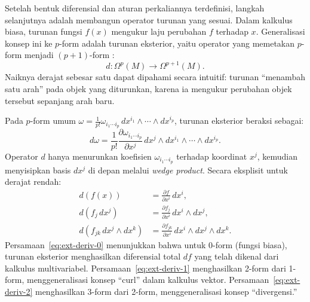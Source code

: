 Setelah bentuk diferensial dan aturan perkaliannya terdefinisi, langkah selanjutnya adalah membangun operator turunan yang sesuai. Dalam kalkulus biasa, turunan fungsi $f(x)$ mengukur laju perubahan $f$ terhadap $x$. Generalisasi konsep ini ke $p$-form adalah turunan eksterior, yaitu operator yang memetakan $p$-form menjadi $(p+1)$-form \cite{nakahara2003geometry}:
\begin{equation}
    d : \Omega^p(M) \longrightarrow \Omega^{p+1}(M).
\end{equation}
Naiknya derajat sebesar satu dapat dipahami secara intuitif: turunan ``menambah satu arah'' pada objek yang diturunkan, karena ia mengukur perubahan objek tersebut sepanjang arah baru.

Pada $p$-form umum $\omega = \frac{1}{p!}\omega_{i_1\cdots i_p}\, dx^{i_1} \wedge \cdots \wedge dx^{i_p}$, turunan eksterior beraksi sebagai:
\begin{equation}\label{eq:ext-deriv}
    d\omega = \frac{1}{p!}\frac{\partial \omega_{i_1\cdots i_p}}{\partial x^j}\, dx^j \wedge dx^{i_1} \wedge \cdots \wedge dx^{i_p}.
\end{equation}
Operator $d$ hanya menurunkan koefisien $\omega_{i_1\cdots i_p}$ terhadap koordinat $x^j$, kemudian menyisipkan basis $dx^j$ di depan melalui \textit{wedge product}. Secara eksplisit untuk derajat rendah:
\begin{align}
    d(f(x)) &= \frac{\partial f}{\partial x^i}\, dx^i, \label{eq:ext-deriv-0}\\
    d(f_j\, dx^j) &= \frac{\partial f_j}{\partial x^i}\, dx^i \wedge dx^j, \label{eq:ext-deriv-1}\\
    d(f_{jk}\, dx^j \wedge dx^k) &= \frac{\partial f_{jk}}{\partial x^i}\, dx^i \wedge dx^j \wedge dx^k. \label{eq:ext-deriv-2}
\end{align}
Persamaan~\eqref{eq:ext-deriv-0} menunjukkan bahwa untuk 0-form (fungsi biasa), turunan eksterior menghasilkan diferensial total $df$ yang telah dikenal dari kalkulus multivariabel. Persamaan~\eqref{eq:ext-deriv-1} menghasilkan 2-form dari 1-form, menggeneralisasi konsep ``curl'' dalam kalkulus vektor. Persamaan~\eqref{eq:ext-deriv-2} menghasilkan 3-form dari 2-form, menggeneralisasi konsep ``divergensi.''

